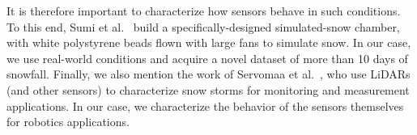 It is therefore important to characterize how sensors behave in such conditions. To this end, Sumi et al.~\cite{sumi-arso-13} build a specifically-designed simulated-snow chamber, with white polystyrene beads flown with large fans to simulate snow. In our case, we use real-world conditions and acquire a novel dataset of more than 10 days of snowfall. Finally, we also mention the work of Servomaa et al.~\cite{servomaa2002snowfall}, who use LiDARs (and other sensors) to characterize snow storms for monitoring and measurement applications. In our case, we characterize the behavior of the sensors themselves for robotics applications.







